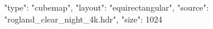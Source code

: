 {
    "type": "cubemap",
    "layout": "equirectangular",
    "source": "rogland_clear_night_4k.hdr",
    "size": 1024
}

